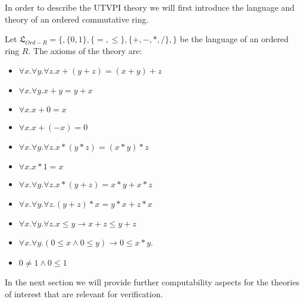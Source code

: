 In order to describe the UTVPI theory we will first introduce the language and theory of an ordered commutative ring.

\begin{definition}
  Let $\mathfrak{L}_{Ord-R} = \{, \{0, 1 \}, \{ = , \leq \}, \{+, -, *, / \}, \}$ be the language of an ordered ring $R$. The axioms of the theory are:
  \begin{itemize}
    \item $\forall x . \forall y . \forall z . x + (y + z) = (x + y) + z$
    \item $\forall x . \forall y .  x + y = y + x$
    \item $\forall x . x + 0 = x$
    \item $\forall x . x + (- x) = 0$
    \item $\forall x . \forall y . \forall z. x * (y * z) = (x * y) * z$
    \item $\forall x . x * 1 = x$
    \item $\forall x . \forall y . \forall z . x * (y + z) = x * y + x * z$
    \item $\forall x . \forall y . \forall z . (y + z) * x = y*x + z * x$
    \item $\forall x . \forall y . \forall z . x \leq y \rightarrow x + z \leq y + z$
    \item $\forall x . \forall y . (0 \leq x \land 0 \leq y) \rightarrow 0 \leq x * y$.
    \item $0 \neq 1 \land 0 \leq 1$ 
  \end{itemize}
\end{definition}

In the next section we will provide further computability aspects for the theories of interest that are relevant for verification.

